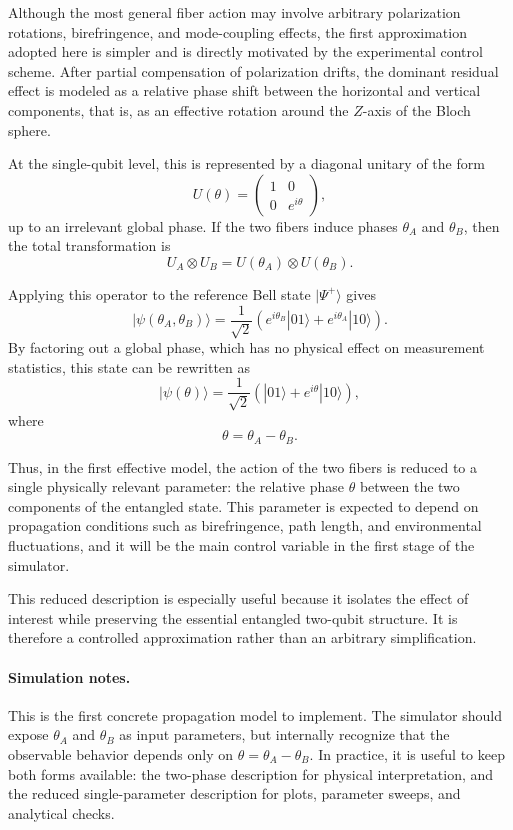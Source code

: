 \documentclass[a4paper]{article}
\begin{document}
Although the most general fiber action may involve arbitrary polarization rotations, birefringence, and mode-coupling effects, the first approximation adopted here is simpler and is directly motivated by the experimental control scheme. After partial compensation of polarization drifts, the dominant residual effect is modeled as a relative phase shift between the horizontal and vertical components, that is, as an effective rotation around the \(Z\)-axis of the Bloch sphere.

At the single-qubit level, this is represented by a diagonal unitary of the form
\[
U(\theta)
=
\begin{pmatrix}
1 & 0\\
0 & e^{i\theta}
\end{pmatrix},
\]
up to an irrelevant global phase. If the two fibers induce phases \(\theta_A\) and \(\theta_B\), then the total transformation is
\[
U_A \otimes U_B
=
U(\theta_A)\otimes U(\theta_B).
\]

Applying this operator to the reference Bell state \( |\Psi^+\rangle \) gives
\[
|\psi(\theta_A,\theta_B)\rangle
=
\frac{1}{\sqrt{2}}
\left(
e^{i\theta_B}|01\rangle
+
e^{i\theta_A}|10\rangle
\right).
\]
By factoring out a global phase, which has no physical effect on measurement statistics, this state can be rewritten as
\[
|\psi(\theta)\rangle
=
\frac{1}{\sqrt{2}}
\left(
|01\rangle
+
e^{i\theta}|10\rangle
\right),
\]
where
\[
\theta = \theta_A - \theta_B.
\]

Thus, in the first effective model, the action of the two fibers is reduced to a single physically relevant parameter: the relative phase \(\theta\) between the two components of the entangled state. This parameter is expected to depend on propagation conditions such as birefringence, path length, and environmental fluctuations, and it will be the main control variable in the first stage of the simulator.

This reduced description is especially useful because it isolates the effect of interest while preserving the essential entangled two-qubit structure. It is therefore a controlled approximation rather than an arbitrary simplification.

\paragraph{Simulation notes.}
This is the first concrete propagation model to implement. The simulator should expose \(\theta_A\) and \(\theta_B\) as input parameters, but internally recognize that the observable behavior depends only on \(\theta=\theta_A-\theta_B\). In practice, it is useful to keep both forms available: the two-phase description for physical interpretation, and the reduced single-parameter description for plots, parameter sweeps, and analytical checks.
\end{document}
